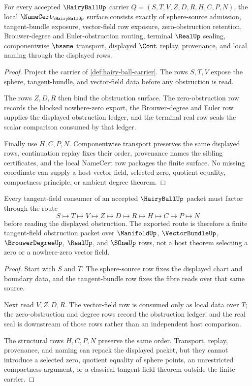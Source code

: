 \begin{theorem}
\label{thm:hairy-ball-namecert-obligations}
For every accepted $\HairyBallUp$ carrier $Q=(S,T,V,Z,D,R,H,C,P,N)$, the local $\NameCert_{\HairyBallUp}$ surface consists exactly of sphere-source admission, tangent-bundle exposure, vector-field row exposure, zero-obstruction retention, Brouwer-degree and Euler-obstruction routing, terminal $\RealUp$ sealing, componentwise $\hsame$ transport, displayed $\Cont$ replay, provenance, and local naming through the displayed rows.
\end{theorem}
\begin{proof}
Project the carrier of \autoref{def:hairy-ball-carrier}. The rows $S,T,V$ expose the sphere, tangent-bundle, and vector-field data before any obstruction is read.

The rows $Z,D,R$ then bind the obstruction surface. The zero-obstruction row records the blocked nowhere-zero export, the Brouwer-degree and Euler row supplies the displayed obstruction ledger, and the terminal real row seals the scalar comparison consumed by that ledger.

Finally use $H,C,P,N$. Componentwise transport preserves the same displayed rows, continuation replay fixes their order, provenance names the sibling certificates, and the local NameCert row packages the finite surface. No missing coordinate can supply a host vector field, selected zero, quotient equality, compactness principle, or ambient degree theorem.
\end{proof}

\begin{theorem}
\label{thm:hairy-ball-tangent-field-route}
Every tangent-field consumer of an accepted $\HairyBallUp$ packet must factor through the route
$$
S\longmapsto T\longmapsto V\longmapsto Z\longmapsto D\longmapsto R\longmapsto H\longmapsto C\longmapsto P\longmapsto N
$$
before reading the displayed obstruction. The exported route is therefore a finite tangent-field obstruction packet over $\ManifoldUp$, $\VectorBundleUp$, $\BrouwerDegreeUp$, $\RealUp$, and $\SOneUp$ rows, not a host theorem selecting a zero or a nowhere-zero vector field.
\end{theorem}
\begin{proof}
Start with $S$ and $T$. The sphere-source row fixes the displayed chart and boundary data, and the tangent-bundle row fixes the fibre reads over that same source.

Next read $V,Z,D,R$. The vector-field row is consumed only as local data over $T$; the zero-obstruction and degree rows record the obstruction ledger; and the real seal is downstream of those rows rather than an independent host comparison.

The structural rows $H,C,P,N$ preserve the same order. Transport, replay, provenance, and naming can repack the displayed packet, but they cannot introduce a selected zero, quotient equality of sphere points, an unrestricted compactness argument, or a classical tangent-field theorem outside the finite carrier.
\end{proof}


